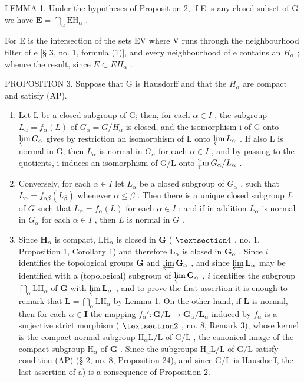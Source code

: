 LEMMA 1. Under the hypotheses of Proposition 2, if E is any closed subset of G we have \(\mathbf{E} = \bigcap_{\alpha} \mathrm{EH}_{\alpha}\) .

For E is the intersection of the sets EV where V runs through the neighbourhood filter of e {[}§ 3, no. 1, formula (1){]}, and every neighbourhood of e contains an \(H_{\alpha}\) ; whence the result, since \(E \subset EH_{\alpha}\) .

PROPOSITION 3. Suppose that G is Hausdorff and that the \(H_{\alpha}\) are compact and satisfy (AP).

\begin{enumerate}
\def\labelenumi{\alph{enumi})}
\item
  Let L be a closed subgroup of G; then, for each \(\alpha\in I\) , the subgroup \(L_{\alpha}=f_{\alpha}(L)\) of \(G_{\alpha}=G/H_{\alpha}\) is closed, and the isomorphism i of G onto \(\varprojlim G_{\alpha}\) gives by restriction an isomorphism of L onto \(\varprojlim L_{\alpha}\) . If also L is normal in G, then \(L_{\alpha}\) is normal in \(G_{\alpha}\) for each \(\alpha\in I\) , and by passing to the quotients, i induces an isomorphism of G/L onto \(\varprojlim G_{\alpha}/L_{\alpha}\) .
\item
  Conversely, for each \(\alpha \in I\) let \(L_{\alpha}\) be a closed subgroup of \(G_{\alpha}\) , such that \(L_{\alpha} = f_{\alpha \beta}(L_{\beta})\) whenever \(\alpha \leqslant \beta\) . Then there is a unique closed subgroup \(L\) of \(G\) such that \(L_{\alpha} = f_{\alpha}(L)\) for each \(\alpha \in I\) ; and if in addition \(L_{\alpha}\) is normal in \(G_{\alpha}\) for each \(\alpha \in I\) , then \(L\) is normal in \(G\) .
\item
  Since \(\mathbf{H}_{\alpha}\) is compact, \(\mathrm{LH}_{\alpha}\) is closed in \(\mathbf{G}\) ( \(\S 4\) , no. 1, Proposition 1, Corollary 1) and therefore \(\mathbf{L}_{\alpha}\) is closed in \(\mathbf{G}_{\alpha}\) . Since \(i\) identifies the topological groups \(\mathbf{G}\) and \(\varprojlim \mathbf{G}_{\alpha}\) , and since \(\varprojlim \mathbf{L}_{\alpha}\) may be identified with a (topological) subgroup of \(\varprojlim \mathbf{G}_{\alpha}\) , \(i\) identifies the subgroup \(\bigcap_{\alpha} \mathrm{LH}_{\alpha}\) of \(\mathbf{G}\) with \(\varprojlim \mathbf{L}_{\alpha}\) , and to prove the first assertion it is enough to remark that \(\mathbf{L} = \bigcap_{\alpha} \mathrm{LH}_{\alpha}\) by Lemma 1. On the other hand, if \(\mathbf{L}\) is normal, then for each \(\alpha \in \mathbf{I}\) the mapping \(f_{\alpha}': \mathbf{G} / \mathbf{L} \to \mathbf{G}_{\alpha} / \mathbf{L}_{\alpha}\) induced by \(f_{\alpha}\) is a surjective strict morphism ( \(\S 2\) , no. 8, Remark 3), whose kernel is the compact normal subgroup \(\mathrm{H}_{\alpha} \mathrm{L} / \mathrm{L}\) of \(\mathrm{G} / \mathrm{L}\) , the canonical image of the compact subgroup \(\mathrm{H}_{\alpha}\) of \(\mathbf{G}\) . Since the subgroups \(\mathrm{H}_{\alpha} \mathrm{L} / \mathrm{L}\) of \(\mathrm{G} / \mathrm{L}\) satisfy condition (AP) (§ 2, no. 8, Proposition 24), and since G/L is Hausdorff, the last assertion of a) is a consequence of Proposition 2.

\end{enumerate}
